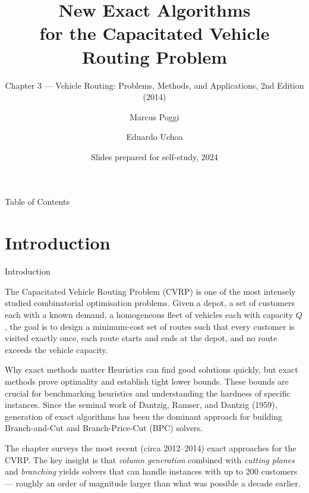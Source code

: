 \documentclass[aspectratio=169,10pt]{beamer}
\title[New Exact Algorithms -- CVRP]{%
  New Exact Algorithms\\for the Capacitated Vehicle Routing Problem}
\subtitle{Chapter 3 --- Vehicle Routing: Problems, Methods,
          and Applications, 2nd Edition (2014)}
\author{Marcus Poggi \and Eduardo Uchoa}
\institute{Pontifical Catholic University of Rio de Janeiro (PUC-Rio)}
\date{Slides prepared for self-study, 2024}
\begin{document}
\begin{frame}
  \titlepage
\end{frame}

\begin{frame}[allowframebreaks]{Table of Contents}
  \tableofcontents
\end{frame}

\section{Introduction}

\begin{frame}[allowframebreaks]{Introduction}

The Capacitated Vehicle Routing Problem (CVRP) is one of the most
intensely studied combinatorial optimisation problems. Given a depot,
a set of customers each with a known demand, a homogeneous fleet of
vehicles each with capacity $Q$, the goal is to design a minimum-cost
set of routes such that every customer is visited exactly once, each
route starts and ends at the depot, and no route exceeds the vehicle
capacity.

\begin{block}{Why exact methods matter}
Heuristics can find good solutions quickly, but exact methods prove
optimality and establish tight lower bounds. These bounds are crucial
for benchmarking heuristics and understanding the hardness of specific
instances. Since the seminal work of Dantzig, Ramser, and Dantzig (1959),
generation of exact algorithms has been the dominant approach for building
Branch-and-Cut and Branch-Price-Cut (BPC) solvers.
\end{block}

\framebreak

The chapter surveys the most recent (circa 2012--2014) exact approaches
for the CVRP. The key insight is that \emph{column generation} combined
with \emph{cutting planes} and \emph{branching} yields solvers that can
handle instances with up to 200 customers --- roughly an order of magnitude
larger than what was possible a decade earlier.


\end{frame}
\end{document}

